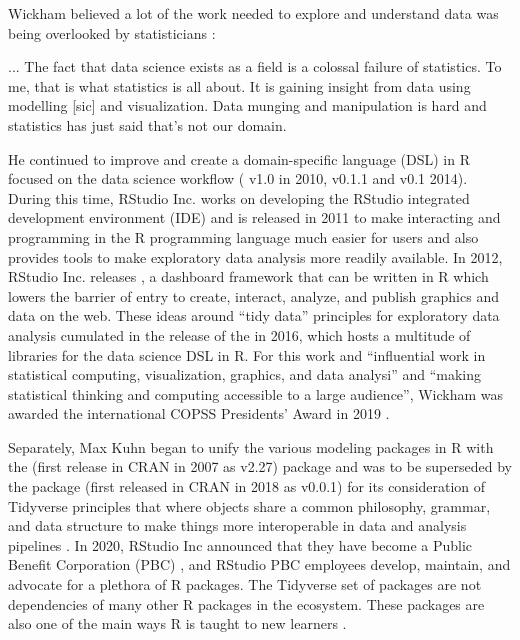 \documentclass[010-intro.tex]{subfiles}
\begin{document}
        Wickham believed a lot of the work needed to explore and understand data was being overlooked by statisticians
        \cite{smithHadleyWickhamWhy2015}:
        \begin{displayquote}
            ... The fact that data science exists as a field is a colossal failure of statistics.
            To me, that is what statistics is all about.
            It is gaining insight from data using modelling [sic] and visualization.
            Data munging and manipulation is hard and statistics has just said that's not our domain.
        \end{displayquote}
        He continued to improve and create a domain-specific language (DSL) in R focused on the data science workflow
        ( v1.0 in 2010,  v0.1.1 and  v0.1 2014).
        During this time,
        RStudio Inc. works on developing the RStudio integrated development environment (IDE)
        and is released in 2011 to make interacting and programming
        in the R programming language much easier for users and also provides tools to make exploratory data analysis more readily available.
        In 2012, RStudio Inc. releases ,
        a dashboard framework that can be written in R which
        lowers the barrier of entry to create, interact, analyze, and publish graphics and data on the web.
        These ideas around ``tidy data'' principles for exploratory data analysis
        \cite{wickhamTidyData2014}
        cumulated in the release of the  in 2016,
        which hosts a multitude of libraries for the data science DSL in R.
        For this work and ``influential work in statistical computing, visualization, graphics, and data analysi'' and
        ``making statistical thinking and computing accessible to a large audience'',
        Wickham was awarded the international COPSS Presidents' Award in 2019
        \cite{InstituteMathematicalStatistics2019}.

        Separately,
        Max Kuhn began to unify the various modeling packages in R with the 
        (first release in CRAN in 2007 as v2.27) package
        and was to be superseded by
        the  package
        (first released in CRAN in 2018 as v0.0.1)
        for its consideration of Tidyverse principles that where objects share a common philosophy, grammar, and data structure
        to make things more interoperable in data and analysis pipelines
        \cite{wickhamR4ds, kuhnTidyModeling2021}.
        In 2020, RStudio Inc announced that they have become a Public Benefit Corporation (PBC)
        \cite{allaireRStudioPBC2020, rstudioRStudio},
        and RStudio PBC employees develop, maintain, and advocate for a plethora of R packages.
        The Tidyverse set of packages are not dependencies of many other R packages in the ecosystem.
        These packages are also one of the main ways R is taught to new learners
        \cite{wickhamR4ds}.
\end{document}
